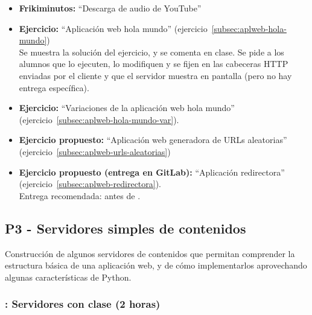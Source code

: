 \documentclass[a4paper,12pt]{article}
\begin{document}
\begin{itemize}
\item \textbf{Frikiminutos:} ``Descarga de audio de YouTube''
\item \textbf{Ejercicio:} ``Aplicación web hola mundo'' (ejercicio~\ref{subsec:aplweb-hola-mundo}) \\
   Se muestra la solución del ejercicio, y se comenta en clase. Se pide a los alumnos que lo ejecuten, lo modifiquen y se fijen en las cabeceras HTTP enviadas por el cliente y que el servidor muestra en pantalla (pero no hay entrega específica).
 \item \textbf{Ejercicio:} ``Variaciones de la aplicación web hola mundo'' (ejercicio~\ref{subsec:aplweb-hola-mundo-var}).
\item \textbf{Ejercicio propuesto:} ``Aplicación web generadora de URLs aleatorias'' (ejercicio~\ref{subsec:aplweb-urls-aleatorias})
\item \textbf{Ejercicio propuesto (entrega en GitLab):} ``Aplicación redirectora'' (ejercicio~\ref{subsec:aplweb-redirectora}). \\
   Entrega recomendada: antes de \martesE.
\end{itemize}


\subsection{P3 - Servidores simples de contenidos}

Construcción de algunos servidores de contenidos que permitan comprender la estructura básica de una aplicación web, y de cómo implementarlos aprovechando algunas características de Python.

\subsubsection{\martesE: Servidores con clase (2 horas)}
\label{cal:martesE}
\end{document}
